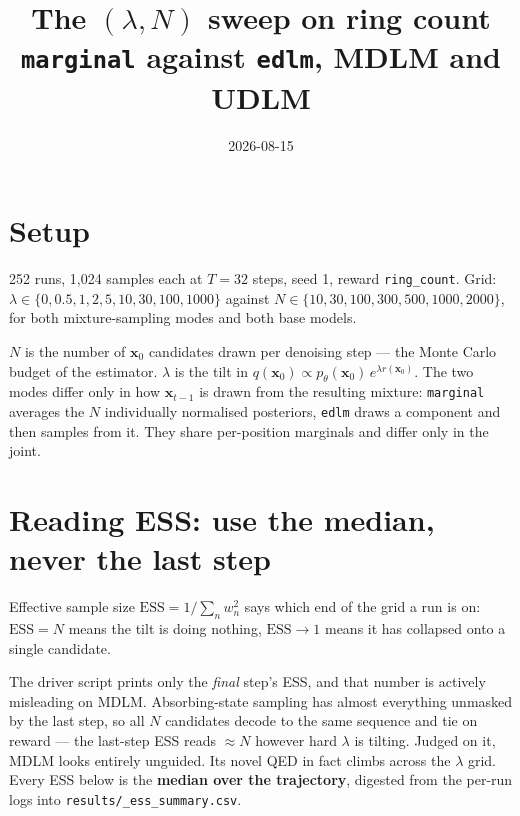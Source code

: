 \documentclass[11pt]{article}
\title{The $(\lambda, N)$ sweep on ring count\\\large \texttt{marginal} against \texttt{edlm}, MDLM and UDLM}
\author{}\date{2026-08-15}
\begin{document}
\maketitle
\section{Setup}

252 runs, 1{,}024 samples each at $T=32$ steps, seed 1, reward
\texttt{ring\_count}. Grid: $\lambda \in \{0, 0.5, 1, 2, 5, 10, 30, 100, 1000\}$ against
$N \in \{10, 30, 100, 300, 500, 1000, 2000\}$, for both mixture-sampling modes
and both base models.

$N$ is the number of $\mathbf{x}_0$ candidates drawn per denoising step --- the
Monte Carlo budget of the estimator. $\lambda$ is the tilt in
$q(\mathbf{x}_0) \propto p_\theta(\mathbf{x}_0)\,e^{\lambda r(\mathbf{x}_0)}$.
The two modes differ only in how $\mathbf{x}_{t-1}$ is drawn from the resulting
mixture: \texttt{marginal} averages the $N$ individually normalised posteriors,
\texttt{edlm} draws a component and then samples from it. They share
per-position marginals and differ only in the joint.

\section{Reading ESS: use the median, never the last step}

Effective sample size $\mathrm{ESS} = 1/\sum_n w_n^2$ says which end of the grid
a run is on: $\mathrm{ESS}=N$ means the tilt is doing nothing, $\mathrm{ESS}\to1$
means it has collapsed onto a single candidate.

The driver script prints only the \emph{final} step's ESS, and that number is
actively misleading on MDLM. Absorbing-state sampling has almost everything
unmasked by the last step, so all $N$ candidates decode to the same sequence and
tie on reward --- the last-step ESS reads $\approx N$ however hard $\lambda$ is
tilting. Judged on it, MDLM looks entirely unguided. Its novel QED in fact climbs
across the $\lambda$ grid. Every ESS below is the \textbf{median over the
trajectory}, digested from the per-run logs into
\texttt{results/\_ess\_summary.csv}.
\end{document}
